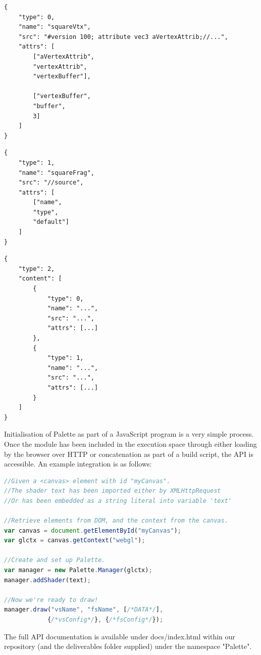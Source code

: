 \documentclass{l3proj}
\begin{document}
\begin{center}
\lstset{%
      basicstyle=\ttfamily\footnotesize\bfseries,
      frame=single,
      xleftmargin=.05\textwidth, xrightmargin=.05\textwidth,
      captionpos=b,
      tabsize=4,
      language=json
    }
\begin{lstlisting}[caption={Vertex Shader JSON Structure},label={lst:vtx-shad-example}]
{
	"type": 0,
	"name": "squareVtx",
	"src": "#version 100; attribute vec3 aVertexAttrib;//...",
	"attrs": [
		["aVertexAttrib",
		"vertexAttrib",
		"vertexBuffer"],
		
		["vertexBuffer",
		"buffer",
		3]
	]
}
\end{lstlisting}
\begin{lstlisting}[caption={Fragment Shader JSON Structure},label={lst:frag-shad-example}]
{
	"type": 1,
	"name": "squareFrag",
	"src": "//source",
	"attrs": [
		["name",
		"type",
		"default"]
	]
}
\end{lstlisting}
\begin{lstlisting}[caption={Shader List JSON Structure},label={lst:list-shad-example}]
{
	"type": 2,
	"content": [
		{
			"type": 0,
			"name": "...",
			"src": "...",
			"attrs": [...]
		},
		{
			"type": 1,
			"name": "...",
			"src": "...",
			"attrs": [...]
		}
	]
}
\end{lstlisting}
\end{center}
Initialisation of Palette as part of a JavaScript program is a very simple process. Once the module has been included in the execution space through either loading by the browser over HTTP or concatenation as part of a build script, the API is accessible. An example integration is as follows:
\begin{lstlisting}[caption={Palette Usage Example},label={lst:palette-example},language=JavaScript]
//Given a <canvas> element with id "myCanvas".
//The shader text has been imported either by XMLHttpRequest
//Or has been embedded as a string literal into variable 'text'

//Retrieve elements from DOM, and the context from the canvas.
var canvas = document.getElementById("myCanvas");
var glctx = canvas.getContext("webgl");

//Create and set up Palette.
var manager = new Palette.Manager(glctx);
manager.addShader(text);

//Now we're ready to draw!
manager.draw("vsName", "fsName", [/*DATA*/],
			{/*vsConfig*/}, {/*fsConfig*/});
\end{lstlisting}

The full API documentation is available under docs/index.html within our repository (and the deliverables folder supplied) under the namespace "Palette".
\end{document}
